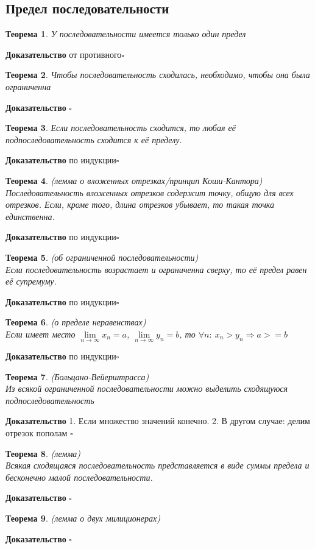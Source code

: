 \documentclass[a4paper]{article}
\newtheorem{theor}{Теорема}
\begin{document}
\subsection{Предел последовательности}
\begin{theor}
У последовательности имеется только один предел
\end{theor}
\textbf{Доказательство} от противного$\square$
\begin{theor}
Чтобы последовательность сходилась, необходимо, чтобы она была ограниченна
\end{theor}
\textbf{Доказательство} $\square$
\begin{theor}
Если последовательность сходится, то любая её подпоследовательность сходится 
к её пределу.
\end{theor}
\textbf{Доказательство} по индукции$\square$
\begin{theor}
(лемма о вложенных отрезках/принцип Коши-Кантора)\\
Последовательность вложенных отрезков содержит точку, общую для всех отрезков. 
Если, кроме того, длина отрезков убывает, то такая точка единственна.
\end{theor}
\textbf{Доказательство} по индукции$\square$
\begin{theor}
(об ограниченной последовательности)\\
Если последовательность возрастает и ограниченна сверху, то её предел равен её 
супремуму.
\end{theor}
\textbf{Доказательство} по индукции$\square$
\begin{theor}
(о пределе  неравенствах)\\
Если имеет место $\lim\limits_{n\to\infty}x_n=a$,
$\lim\limits_{n\to\infty}y_n=b$, то $\forall n:~x_n>y_n\Rightarrow a>=b$
\end{theor}
\textbf{Доказательство} по индукции$\square$
\begin{theor}
(Больцано-Вейерштрасса)\\
Из всякой ограниченной последовательности можно выделить сходящуюся 
подпоследовательность
\end{theor}
\textbf{Доказательство} 1. Если множество значений конечно. 2. В другом случае:
делим отрезок пополам $\square$
\begin{theor}
(лемма)\\
Всякая сходящаяся последовательность представляется в виде суммы предела и 
бесконечно малой последовательности. 
\end{theor}
\textbf{Доказательство} $\square$
\begin{theor}
(лемма о двух милиционерах)\\

\end{theor}
\textbf{Доказательство} $\square$
\end{document}
